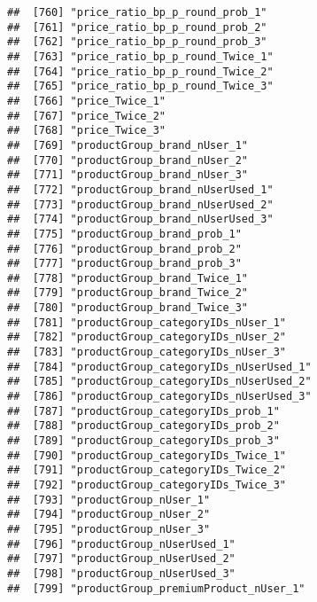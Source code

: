 \documentclass[10pt]{report}
\begin{document}
\begin{verbatim}
##  [760] "price_ratio_bp_p_round_prob_1"                        
##  [761] "price_ratio_bp_p_round_prob_2"                        
##  [762] "price_ratio_bp_p_round_prob_3"                        
##  [763] "price_ratio_bp_p_round_Twice_1"                       
##  [764] "price_ratio_bp_p_round_Twice_2"                       
##  [765] "price_ratio_bp_p_round_Twice_3"                       
##  [766] "price_Twice_1"                                        
##  [767] "price_Twice_2"                                        
##  [768] "price_Twice_3"                                        
##  [769] "productGroup_brand_nUser_1"                           
##  [770] "productGroup_brand_nUser_2"                           
##  [771] "productGroup_brand_nUser_3"                           
##  [772] "productGroup_brand_nUserUsed_1"                       
##  [773] "productGroup_brand_nUserUsed_2"                       
##  [774] "productGroup_brand_nUserUsed_3"                       
##  [775] "productGroup_brand_prob_1"                            
##  [776] "productGroup_brand_prob_2"                            
##  [777] "productGroup_brand_prob_3"                            
##  [778] "productGroup_brand_Twice_1"                           
##  [779] "productGroup_brand_Twice_2"                           
##  [780] "productGroup_brand_Twice_3"                           
##  [781] "productGroup_categoryIDs_nUser_1"                     
##  [782] "productGroup_categoryIDs_nUser_2"                     
##  [783] "productGroup_categoryIDs_nUser_3"                     
##  [784] "productGroup_categoryIDs_nUserUsed_1"                 
##  [785] "productGroup_categoryIDs_nUserUsed_2"                 
##  [786] "productGroup_categoryIDs_nUserUsed_3"                 
##  [787] "productGroup_categoryIDs_prob_1"                      
##  [788] "productGroup_categoryIDs_prob_2"                      
##  [789] "productGroup_categoryIDs_prob_3"                      
##  [790] "productGroup_categoryIDs_Twice_1"                     
##  [791] "productGroup_categoryIDs_Twice_2"                     
##  [792] "productGroup_categoryIDs_Twice_3"                     
##  [793] "productGroup_nUser_1"                                 
##  [794] "productGroup_nUser_2"                                 
##  [795] "productGroup_nUser_3"                                 
##  [796] "productGroup_nUserUsed_1"                             
##  [797] "productGroup_nUserUsed_2"                             
##  [798] "productGroup_nUserUsed_3"                             
##  [799] "productGroup_premiumProduct_nUser_1"                  

\end{verbatim}
\end{document}
